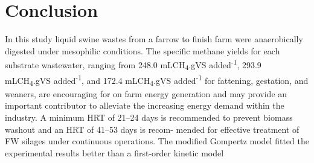 \section{Conclusion}
In this study liquid swine wastes from a farrow to finish farm were anaerobically digested under mesophilic conditions. The specific methane yields for each substrate wastewater, ranging from 248.0 mLCH\textsubscript{4}.gVS added\textsuperscript{-1}, 293.9 mLCH\textsubscript{4}.gVS added\textsuperscript{-1}, and 172.4 mLCH\textsubscript{4}.gVS added\textsuperscript{-1} for fattening, gestation, and weaners, are encouraging for on farm energy generation and may provide an important contributor to alleviate the increasing energy demand within the industry. A minimum HRT of 21–24 days is recommended to prevent biomass washout and an HRT of 41–53 days is recom- mended for effective treatment of FW silages under continuous operations. The modified Gompertz model fitted the experimental results better than a first-order kinetic model